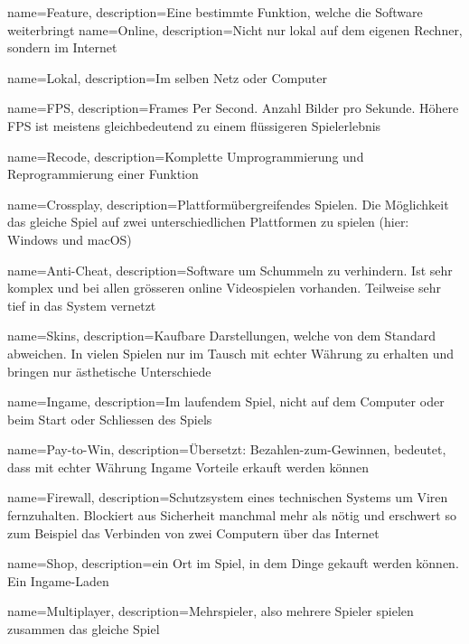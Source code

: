 
{
  name={Feature},
  description={Eine bestimmte Funktion, welche die Software weiterbringt}
}
{
  name={Online},
  description={Nicht nur lokal auf dem eigenen Rechner, sondern im Internet}
}

{
  name={Lokal},
  description={Im selben Netz oder Computer}
}

{
  name={FPS},
  description={Frames Per Second. Anzahl Bilder pro Sekunde. Höhere FPS ist meistens gleichbedeutend zu einem flüssigeren Spielerlebnis}
}

{
  name={Recode},
  description={Komplette Umprogrammierung und Reprogrammierung einer Funktion}
}

{
  name={Crossplay},
  description={Plattformübergreifendes Spielen. Die Möglichkeit das gleiche Spiel auf zwei unterschiedlichen Plattformen zu spielen (hier: Windows und macOS)}
}

{
  name={Anti-Cheat},
  description={Software um Schummeln zu verhindern.
  Ist sehr komplex und bei allen grösseren online Videospielen vorhanden.
  Teilweise sehr tief in das System vernetzt}
}

{
  name={Skins},
  description={Kaufbare Darstellungen, welche von dem Standard abweichen.
  In vielen Spielen nur im Tausch mit echter Währung zu erhalten und bringen nur ästhetische Unterschiede}
}

{
  name={Ingame},
  description={Im laufendem Spiel, nicht auf dem Computer oder beim Start oder Schliessen des Spiels}
}

{
  name={Pay-to-Win},
  description={Übersetzt: Bezahlen-zum-Gewinnen, bedeutet, dass mit echter Währung Ingame Vorteile erkauft werden können}
}

{
  name={Firewall},
  description={Schutzsystem eines technischen Systems um Viren fernzuhalten.
  Blockiert aus Sicherheit manchmal mehr als nötig und erschwert so zum Beispiel das Verbinden von zwei Computern über das Internet}
}

{
  name={Shop},
  description={ein Ort im Spiel, in dem Dinge gekauft werden können. Ein Ingame-Laden}
}


{
  name={Multiplayer},
  description={Mehrspieler, also mehrere Spieler spielen zusammen das gleiche Spiel}
}

